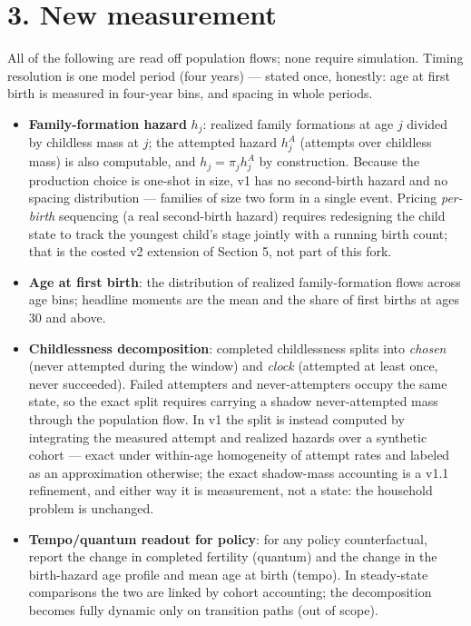 \documentclass[11pt]{article}
\begin{document}
\section*{3. New measurement}

All of the following are read off population flows; none require simulation.
Timing resolution is one model period (four years) --- stated once,
honestly: age at first birth is measured in four-year bins, and spacing in
whole periods.

\begin{itemize}
\itemsep1pt
\item \textbf{Family-formation hazard} $h_j$: realized family formations at
age $j$ divided by childless mass at $j$; the attempted hazard $h^A_j$
(attempts over childless mass) is also computable, and $h_j = \pi_j h^A_j$
by construction. Because the production choice is one-shot in size, v1 has
no second-birth hazard and no spacing distribution --- families of size two
form in a single event. Pricing \emph{per-birth} sequencing (a real
second-birth hazard) requires redesigning the child state to track the
youngest child's stage jointly with a running birth count; that is the
costed v2 extension of Section 5, not part of this fork.
\item \textbf{Age at first birth}: the distribution of realized
family-formation flows across age bins; headline moments are the mean and
the share of first births at ages 30 and above.
\item \textbf{Childlessness decomposition}: completed childlessness splits
into \emph{chosen} (never attempted during the window) and \emph{clock}
(attempted at least once, never succeeded). Failed attempters and
never-attempters occupy the same state, so the exact split requires
carrying a shadow never-attempted mass through the population flow. In v1
the split is instead computed by integrating the measured attempt and
realized hazards over a synthetic cohort --- exact under within-age
homogeneity of attempt rates and labeled as an approximation otherwise;
the exact shadow-mass accounting is a v1.1 refinement, and either way it is
measurement, not a state: the household problem is unchanged.
\item \textbf{Tempo/quantum readout for policy}: for any policy
counterfactual, report the change in completed fertility (quantum) and the
change in the birth-hazard age profile and mean age at birth (tempo). In
steady-state comparisons the two are linked by cohort accounting; the
decomposition becomes fully dynamic only on transition paths (out of
scope).
\end{itemize}
\end{document}
